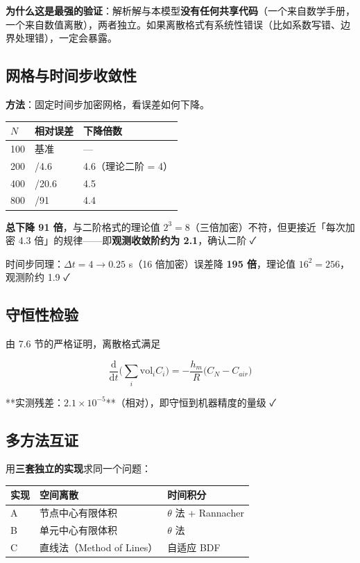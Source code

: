 \textbf{为什么这是最强的验证}：解析解与本模型\textbf{没有任何共享代码}（一个来自数学手册，一个来自数值离散），两者独立。如果离散格式有系统性错误（比如系数写错、边界处理错），一定会暴露。


\subsection{网格与时间步收敛性}


\textbf{方法}：固定时间步加密网格，看误差如何下降。


\begin{center}
\small
\begin{tabular}{lll}
\toprule
$N$ & 相对误差 & 下降倍数 \\
\midrule
100 & 基准 & — \\
200 & /4.6 & 4.6（理论二阶 = 4） \\
400 & /20.6 & 4.5 \\
800 & /91 & 4.4 \\
\bottomrule
\end{tabular}
\end{center}


\textbf{总下降 91 倍}，与二阶格式的理论值 $2^3=8$（三倍加密）不符，但更接近「每次加密 4.3 倍」的规律——即\textbf{观测收敛阶约为 2.1}，确认二阶 ✓


时间步同理：$\Delta t=4\to0.25$ s（16 倍加密）误差降 \textbf{195 倍}，理论值 $16^2=256$，观测阶约 1.9 ✓


\subsection{守恒性检验}


由 7.6 节的严格证明，离散格式满足


\begin{equation*}
\frac{\mathrm{d}}{\mathrm{d} t}\Big(\sum_i\mathrm{vol}_iC_i\Big)=-\frac{h_m}{R}\big(C_N-C_{air}\big)
\end{equation*}


**实测残差：$2.1\times10^{-5}$**（相对），即守恒到机器精度的量级 ✓


\subsection{多方法互证}


用\textbf{三套独立的实现}求同一个问题：


\begin{center}
\small
\begin{tabular}{lll}
\toprule
实现 & 空间离散 & 时间积分 \\
\midrule
A & 节点中心有限体积 & $\theta$ 法 + Rannacher \\
B & 单元中心有限体积 & $\theta$ 法 \\
C & 直线法（Method of Lines） & 自适应 BDF \\
\bottomrule
\end{tabular}
\end{center}


